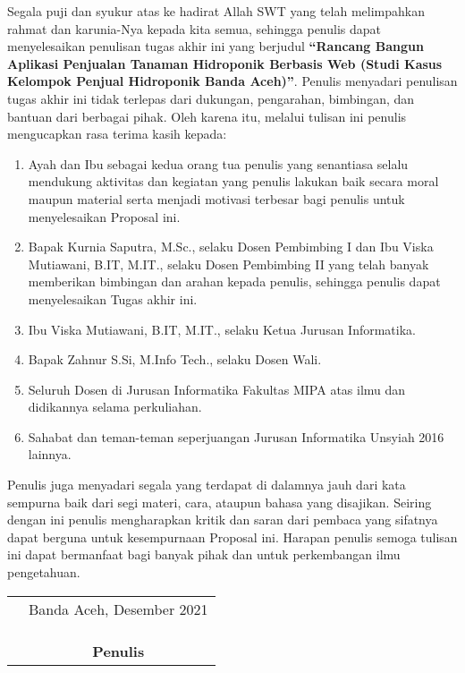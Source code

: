 \preface %


Segala puji dan syukur atas ke hadirat Allah SWT yang telah melimpahkan rahmat dan karunia-Nya kepada kita semua, sehingga penulis dapat menyelesaikan penulisan tugas akhir ini yang berjudul \textbf{“Rancang Bangun Aplikasi Penjualan Tanaman Hidroponik Berbasis Web (Studi Kasus Kelompok Penjual Hidroponik Banda Aceh)”}. Penulis menyadari penulisan tugas akhir ini tidak terlepas dari dukungan, pengarahan, bimbingan, dan bantuan dari berbagai pihak. Oleh karena itu, melalui tulisan ini penulis mengucapkan rasa terima kasih kepada:

\begin{enumerate}
	\item{Ayah dan Ibu sebagai kedua orang tua penulis yang senantiasa selalu mendukung aktivitas dan kegiatan yang penulis lakukan baik secara moral maupun material serta menjadi motivasi terbesar bagi penulis untuk menyelesaikan Proposal ini.}
	\item{Bapak Kurnia Saputra, M.Sc., selaku Dosen Pembimbing I dan Ibu Viska Mutiawani, B.IT, M.IT., selaku Dosen Pembimbing II yang telah banyak memberikan bimbingan dan arahan kepada penulis, sehingga penulis dapat menyelesaikan Tugas akhir ini.}
	\item {Ibu Viska Mutiawani, B.IT, M.IT., selaku Ketua Jurusan Informatika.}
	\item{Bapak Zahnur S.Si, M.Info Tech., selaku Dosen Wali.}
	\item{Seluruh Dosen di Jurusan Informatika Fakultas MIPA atas ilmu dan didikannya selama perkuliahan.}
	\item{Sahabat dan teman-teman seperjuangan Jurusan Informatika Unsyiah 2016 lainnya.}
\end{enumerate}


Penulis juga menyadari segala yang terdapat di dalamnya jauh dari kata sempurna baik dari segi materi, cara, ataupun bahasa yang disajikan. Seiring dengan ini penulis mengharapkan kritik dan saran dari pembaca yang sifatnya dapat berguna untuk kesempurnaan Proposal ini. Harapan penulis semoga tulisan ini dapat bermanfaat bagi banyak pihak dan untuk perkembangan ilmu pengetahuan.

\vspace{1cm}


\begin{tabular}{p{7.5cm}c}
	&Banda Aceh, Desember 2021\\
	&\\
	&\\
	&\\
	&\textbf{Penulis}
\end{tabular}